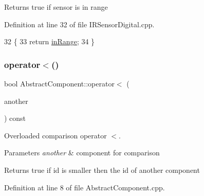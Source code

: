 \begin{DoxyReturn}{Returns}
true if sensor is in range 
\end{DoxyReturn}


Definition at line 32 of file I\+R\+Sensor\+Digital.\+cpp.


\begin{DoxyCode}
32                                 \{
33     \textcolor{keywordflow}{return} \hyperlink{class_i_r_sensor_digital_abeaf8c370c70ac755170a77c92788c57}{inRange};
34 \}
\end{DoxyCode}
\mbox{\label{class_abstract_component_a0c2e458144111c5f599c66f168516abc}} 
\subsubsection{\texorpdfstring{operator$<$()}{operator<()}}
{\footnotesize\ttfamily bool Abstract\+Component\+::operator$<$ (\begin{DoxyParamCaption}\item[{const \hyperlink{class_abstract_component}{Abstract\+Component} \&}]{another }\end{DoxyParamCaption}) const\hspace{0.3cm}{\ttfamily [inherited]}}



Overloaded comparison operator \textquotesingle{}$<$\textquotesingle{}. 


\begin{DoxyParams}{Parameters}
{\em another} & component for comparison \\
\hline
\end{DoxyParams}
\begin{DoxyReturn}{Returns}
true if id is smaller then the id of another component 
\end{DoxyReturn}


Definition at line 8 of file Abstract\+Component.\+cpp.


